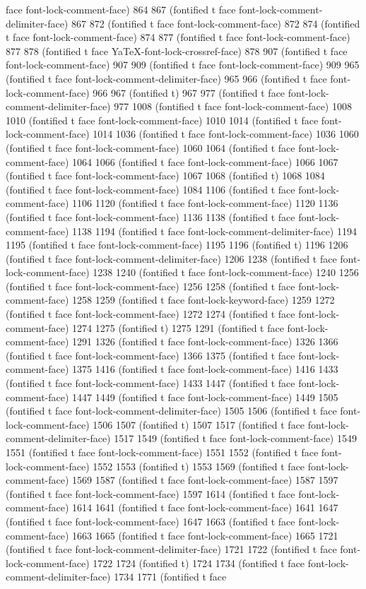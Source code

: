 {{face font-lock-comment-face) 864 867 (fontified t face font-lock-comment-delimiter-face) 867 872 (fontified t face font-lock-comment-face) 872 874 (fontified t face font-lock-comment-face) 874 877 (fontified t face font-lock-comment-face) 877 878 (fontified t face YaTeX-font-lock-crossref-face) 878 907 (fontified t face font-lock-comment-face) 907 909 (fontified t face font-lock-comment-face) 909 965 (fontified t face font-lock-comment-delimiter-face) 965 966 (fontified t face font-lock-comment-face) 966 967 (fontified t) 967 977 (fontified t face font-lock-comment-delimiter-face) 977 1008 (fontified t face font-lock-comment-face) 1008 1010 (fontified t face font-lock-comment-face) 1010 1014 (fontified t face font-lock-comment-face) 1014 1036 (fontified t face font-lock-comment-face) 1036 1060 (fontified t face font-lock-comment-face) 1060 1064 (fontified t face font-lock-comment-face) 1064 1066 (fontified t face font-lock-comment-face) 1066 1067 (fontified t face font-lock-comment-face) 1067 1068 (fontified t) 1068 1084 (fontified t face font-lock-comment-face) 1084 1106 (fontified t face font-lock-comment-face) 1106 1120 (fontified t face font-lock-comment-face) 1120 1136 (fontified t face font-lock-comment-face) 1136 1138 (fontified t face font-lock-comment-face) 1138 1194 (fontified t face font-lock-comment-delimiter-face) 1194 1195 (fontified t face font-lock-comment-face) 1195 1196 (fontified t) 1196 1206 (fontified t face font-lock-comment-delimiter-face) 1206 1238 (fontified t face font-lock-comment-face) 1238 1240 (fontified t face font-lock-comment-face) 1240 1256 (fontified t face font-lock-comment-face) 1256 1258 (fontified t face font-lock-comment-face) 1258 1259 (fontified t face font-lock-keyword-face) 1259 1272 (fontified t face font-lock-comment-face) 1272 1274 (fontified t face font-lock-comment-face) 1274 1275 (fontified t) 1275 1291 (fontified t face font-lock-comment-face) 1291 1326 (fontified t face font-lock-comment-face) 1326 1366 (fontified t face font-lock-comment-face) 1366 1375 (fontified t face font-lock-comment-face) 1375 1416 (fontified t face font-lock-comment-face) 1416 1433 (fontified t face font-lock-comment-face) 1433 1447 (fontified t face font-lock-comment-face) 1447 1449 (fontified t face font-lock-comment-face) 1449 1505 (fontified t face font-lock-comment-delimiter-face) 1505 1506 (fontified t face font-lock-comment-face) 1506 1507 (fontified t) 1507 1517 (fontified t face font-lock-comment-delimiter-face) 1517 1549 (fontified t face font-lock-comment-face) 1549 1551 (fontified t face font-lock-comment-face) 1551 1552 (fontified t face font-lock-comment-face) 1552 1553 (fontified t) 1553 1569 (fontified t face font-lock-comment-face) 1569 1587 (fontified t face font-lock-comment-face) 1587 1597 (fontified t face font-lock-comment-face) 1597 1614 (fontified t face font-lock-comment-face) 1614 1641 (fontified t face font-lock-comment-face) 1641 1647 (fontified t face font-lock-comment-face) 1647 1663 (fontified t face font-lock-comment-face) 1663 1665 (fontified t face font-lock-comment-face) 1665 1721 (fontified t face font-lock-comment-delimiter-face) 1721 1722 (fontified t face font-lock-comment-face) 1722 1724 (fontified t) 1724 1734 (fontified t face font-lock-comment-delimiter-face) 1734 1771 (fontified t face }}
